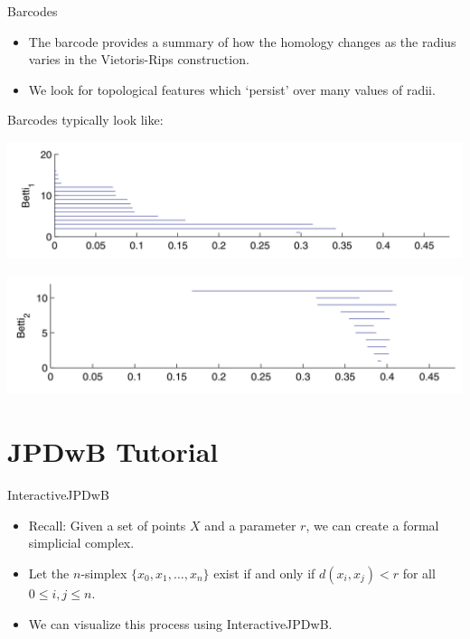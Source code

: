 \documentclass[usenames,dvipsnames,aspectratio=1610]{beamer}
\begin{document}
\begin{frame}{Barcodes}
  \begin{itemize}
    \item The barcode provides a summary of how the homology changes as the
      radius varies in the Vietoris-Rips construction.
    \item We look for topological features which `persist' over many values of radii.
  \end{itemize}

  Barcodes typically look like:

  \begin{minipage}{\textwidth}
  \begin{minipage}{0.5\textwidth}
    \centering
    \includegraphics[scale=0.25]{images/betti1.png}
  \end{minipage}
  \begin{minipage}{0.5\textwidth}
    \centering
    \includegraphics[scale=0.25]{images/betti2.png}
  \end{minipage}
\end{minipage}
\end{frame}
  

\section{JPDwB Tutorial}  
\begin{frame}{InteractiveJPDwB}
\begin{itemize}
\item Recall: Given a set of points $X$ and a parameter $r$, we can create a formal simplicial complex.
\item Let the $n$-simplex $\{x_0, x_1, \ldots, x_n\}$ exist if and only if $d(x_i, x_j) < r$ for all $0 \leq i,j\leq n$. 
\item We can visualize this process using InteractiveJPDwB.
\end{itemize}
\end{frame}
\end{document}
